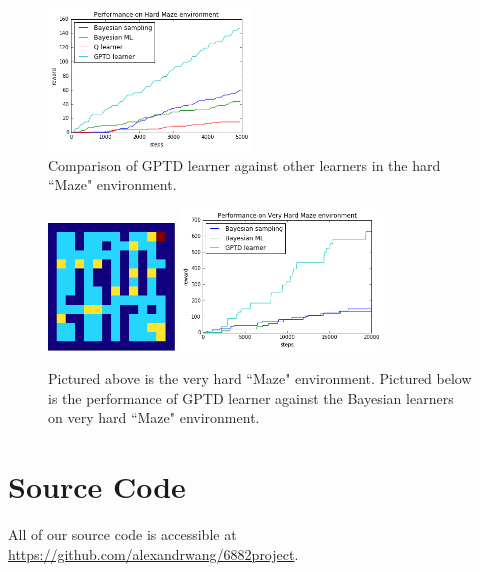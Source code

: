 \documentclass[10pt, twocolumn, twoside]{article}
\begin{document}
\begin{figure}[!htb]
\centering
\includegraphics[width=0.48\textwidth]{gptdCompare}
\caption{\label{fig:easyhardPerf} Comparison of GPTD learner against other learners in the hard ``Maze" environment.}
\end{figure}
\begin{figure}[!htb]
\centering
\includegraphics[width=0.30\textwidth]{veryhardmaze}
\includegraphics[width=0.48\textwidth]{veryHardMazePerf}
\caption{\label{fig:easyhardPerf} Pictured above is the very hard ``Maze" environment. Pictured below is the performance of GPTD learner against the Bayesian learners on very hard ``Maze" environment.}
\end{figure}

\section{Source Code}
All of our source code is accessible at \url{https://github.com/alexandrwang/6882project}.



\end{document}

